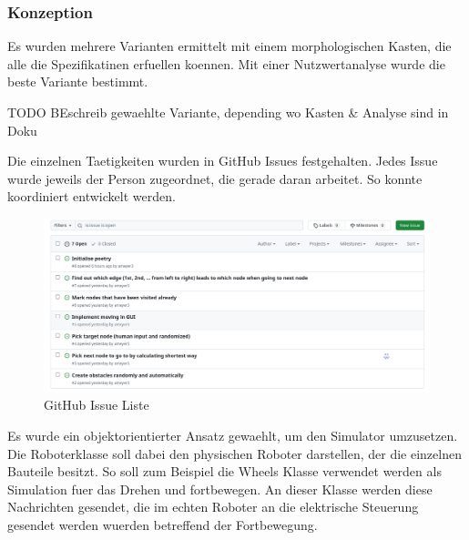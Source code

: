 \subsubsection{Konzeption}

Es wurden mehrere Varianten ermittelt mit einem morphologischen Kasten, die alle die Spezifikatinen erfuellen koennen. Mit einer Nutzwertanalyse wurde die beste Variante bestimmt.

TODO BEschreib gewaehlte Variante, depending wo Kasten \& Analyse sind in Doku

Die einzelnen Taetigkeiten wurden in GitHub Issues festgehalten. Jedes Issue wurde jeweils der Person zugeordnet, die gerade daran arbeitet. So konnte koordiniert entwickelt werden.

\begin{figure}[H]
\centering
\includegraphics[width=\textwidth]{img/github-issues.png}
\caption{GitHub Issue Liste}
\label{fig:github-issues}
\end{figure}

Es wurde ein objektorientierter Ansatz gewaehlt, um den Simulator umzusetzen. Die Roboterklasse soll dabei den physischen Roboter darstellen, der die einzelnen Bauteile besitzt. So soll zum Beispiel die Wheels Klasse verwendet werden als Simulation fuer das Drehen und fortbewegen. An dieser Klasse werden diese Nachrichten gesendet, die im echten Roboter an die elektrische Steuerung gesendet werden wuerden betreffend der Fortbewegung.


